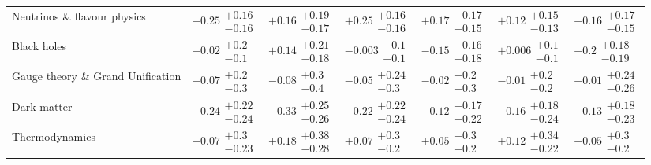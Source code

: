 \begin{table}[H]
\begin{tabular}{lllllll}
Neutrinos \& flavour physics              &    $\bm{+0.25}\substack{+0.16 \\ -0.16}$ &         $+0.16\substack{+0.19 \\ -0.17}$ &    $\bm{+0.25}\substack{+0.16 \\ -0.16}$ &    $\bm{+0.17}\substack{+0.17 \\ -0.15}$ &         $+0.12\substack{+0.15 \\ -0.13}$ &    $\bm{+0.16}\substack{+0.17 \\ -0.15}$ \\
Black holes                               &           $+0.02\substack{+0.2 \\ -0.1}$ &         $+0.14\substack{+0.21 \\ -0.18}$ &          $-0.003\substack{+0.1 \\ -0.1}$ &         $-0.15\substack{+0.16 \\ -0.18}$ &          $+0.006\substack{+0.1 \\ -0.1}$ &     $\bm{-0.2}\substack{+0.18 \\ -0.19}$ \\
Gauge theory \& Grand Unification         &           $-0.07\substack{+0.2 \\ -0.3}$ &           $-0.08\substack{+0.3 \\ -0.4}$ &          $-0.05\substack{+0.24 \\ -0.3}$ &           $-0.02\substack{+0.2 \\ -0.3}$ &           $-0.01\substack{+0.2 \\ -0.2}$ &         $-0.01\substack{+0.24 \\ -0.26}$ \\
Dark matter                               &    $\bm{-0.24}\substack{+0.22 \\ -0.24}$ &    $\bm{-0.33}\substack{+0.25 \\ -0.26}$ &    $\bm{-0.22}\substack{+0.22 \\ -0.24}$ &         $-0.12\substack{+0.17 \\ -0.22}$ &         $-0.16\substack{+0.18 \\ -0.24}$ &         $-0.13\substack{+0.18 \\ -0.23}$ \\
Thermodynamics                            &          $+0.07\substack{+0.3 \\ -0.23}$ &         $+0.18\substack{+0.38 \\ -0.28}$ &           $+0.07\substack{+0.3 \\ -0.2}$ &           $+0.05\substack{+0.3 \\ -0.2}$ &         $+0.12\substack{+0.34 \\ -0.22}$ &           $+0.05\substack{+0.3 \\ -0.2}$ \\

\end{tabular}
\end{table}
